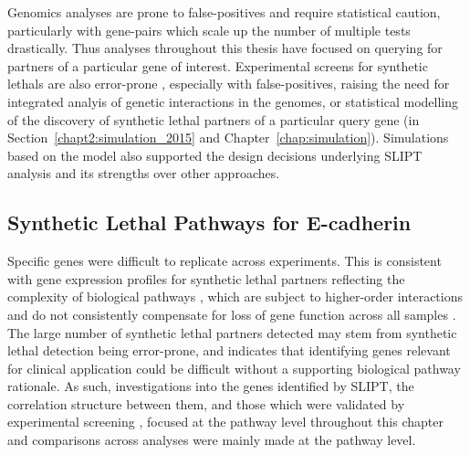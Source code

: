 Genomics analyses are prone to false-positives and require statistical caution, particularly with gene-pairs which scale up the number of multiple tests drastically. %
Thus analyses throughout this thesis have focused on querying for partners of a particular gene of interest. 
Experimental screens for \glspl{synthetic lethal} are also error-prone \citep{Lu2015, Fece2015, Lord2014}, especially with false-positives, raising the need for integrated analyis of genetic interactions in the \glspl{genome}, or statistical modelling of the discovery of \gls{synthetic lethal} partners of a particular query gene (in Section~\ref{chapt2:simulation_2015} and Chapter~\ref{chap:simulation}). Simulations based on the model also supported the design decisions underlying \gls{SLIPT} analysis and its strengths over other approaches.

\subsection{Synthetic Lethal Pathways for E-cadherin}

Specific genes were difficult to replicate across experiments. This is consistent with \gls{gene expression} profiles for \gls{synthetic lethal} partners reflecting the complexity of biological \glspl{pathway} \citep{Perou2000}, which are subject to higher-order interactions and do not consistently compensate for loss of gene function across all samples \citep{Jerby2014, Lu2015}. %
The large number of \gls{synthetic lethal} partners detected may stem from \gls{synthetic lethal} detection being error-prone, and indicates that identifying genes relevant for clinical application could be difficult without a supporting biological \gls{pathway} rationale. As such, investigations into the genes identified by \gls{SLIPT}, the correlation structure between them, and those which were validated by experimental screening \citep{Telford2015}, focused at the \gls{pathway} level throughout this chapter and comparisons across analyses were mainly made at the \gls{pathway} level. %

